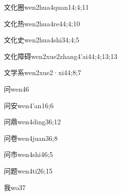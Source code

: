 \begin{verbete}{文化圈}{wen2hua4quan1}{4;4;11}
\end{verbete}

\begin{verbete}{文化热}{wen2hua4re4}{4;4;10}
\end{verbete}

\begin{verbete}{文化史}{wen2hua4shi3}{4;4;5}
\end{verbete}

\begin{verbete}{文化障碍}{wen2xue2zhang4'ai4}{4;4;13;13}
\end{verbete}

\begin{verbete}{文学系}{wen2xue2·xi4}{4;8;7}
\end{verbete}

\begin{verbete}{问}{wen4}{6}
\end{verbete}

\begin{verbete}{问安}{wen4'an1}{6;6}
\end{verbete}

\begin{verbete}{问鼎}{wen4ding3}{6;12}
\end{verbete}

\begin{verbete}{问卷}{wen4juan3}{6;8}
\end{verbete}

\begin{verbete}{问市}{wen4shi4}{6;5}
\end{verbete}

\begin{verbete}{问题}{wen4ti2}{6;15}
\end{verbete}

\begin{verbete}{我}{wo3}{7}
\end{verbete}

